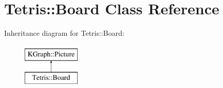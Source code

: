 \hypertarget{class_tetris_1_1_board}{\section{Tetris\-:\-:Board Class Reference}
\label{class_tetris_1_1_board}
}
Inheritance diagram for Tetris\-:\-:Board\-:\begin{figure}[H]
\begin{center}
\leavevmode
\includegraphics[height=2.000000cm]{class_tetris_1_1_board}
\end{center}
\end{figure}
